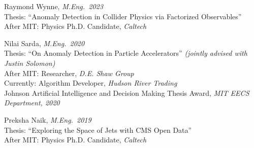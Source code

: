 \bbl

\item Raymond Wynne, \emph{M.Eng.~2023}
\\ Thesis: ``Anomaly Detection in Collider Physics via Factorized Observables''
\\ After MIT: Physics Ph.D. Candidate, \emph{Caltech}

\item Nilai Sarda, \emph{M.Eng.~2020}
\\ Thesis: ``On Anomaly Detection in Particle Accelerators'' \emph{(jointly advised with Justin Solomon)}
\\ After MIT: Researcher, \emph{D.E. Shaw Group}
\\ Currently: Algorithm Developer, \emph{Hudson River Trading}
\\ Johnson Artificial Intelligence and Decision Making Thesis Award, \emph{MIT EECS Department, 2020}

\item Preksha Naik, \emph{M.Eng.~2019}
\\ Thesis: ``Exploring the Space of Jets with CMS Open Data''
\\ After MIT: Physics Ph.D. Candidate, \emph{Caltech}

\el
